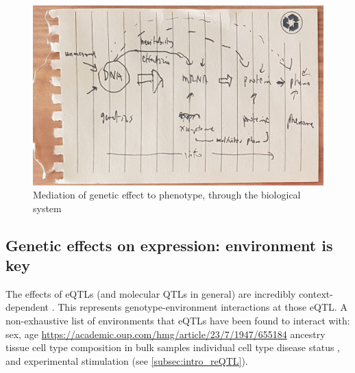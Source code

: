 \begin{outline}
\begin{figure}
    \centering
    \includegraphics[width=1.0\textwidth,page=1]{mainmatter/figures/chapter_01/fig_mockup_systemsBio_Screenshot 2020-05-21 at 17.08.47.png}
    \caption{Mediation of genetic effect to phenotype, through the biological system}
    \label{fig:intro_sysBio}
\end{figure}

\subsection{Genetic effects on expression: environment is key}

\1 The effects of \glspl{eQTL} (and molecular \glspl{QTL} in general) are incredibly context-dependent \autocite{albert2015RoleRegulatoryVariation,vandiedonck2017GeneticAssociationMolecular}.
    \2 This represents genotype-environment interactions at those eQTL.
    \2 A non-exhaustive list of environments that \glspl{eQTL} have been found to interact with:
        \3 sex, age \url{https://academic.oup.com/hmg/article/23/7/1947/655184}
        \3 ancestry \autocite{dejager2015ImmVarProjectInsights,nedelec2016GeneticAncestryNatural,quach2017LivingAdaptiveWorld}
        \3 tissue \autocite{nica2011ArchitectureGeneRegulatory,aguet2017GeneticEffectsGene}
        \3 cell type composition in bulk samples \autocite{westra2015CellSpecificEQTL,zhernakova2017IdentificationContextdependentExpression,glastonbury2019CellTypeHeterogeneityAdipose,kim-hellmuth2019CellTypeSpecific}
        \3 individual cell type \autocite{dimas2009CommonRegulatoryVariation,dejager2015ImmVarProjectInsights,peters2016InsightGenotypePhenotypeAssociations,chen2016GeneticDriversEpigenetic,kim-hellmuth2019CellTypeSpecific}
        \3 disease status \autocite{peters2016InsightGenotypePhenotypeAssociations},
        \3 and experimental stimulation (see \autoref{subsec:intro_reQTL}).


\end{outline}
